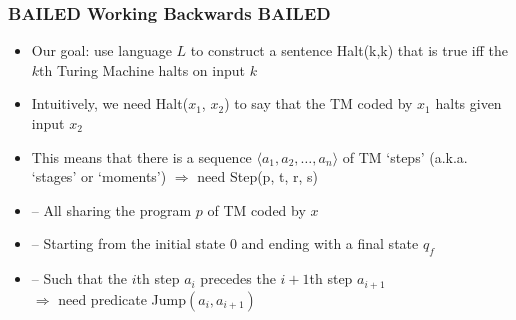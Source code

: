 \fi %



















\iffalse %

\begin{frame}
\frametitle{BAILED Working Backwards BAILED}

\begin{itemize}[<+->]

\item Our goal: use language $L$ to construct a sentence \textrm{Halt(k,k)} that is true iff the $k$th Turing Machine halts on input $k$



\item Intuitively, we need \textrm{Halt($x_1$, $x_2$)} to say that the TM coded by $x_1$ halts given input $x_2$ 

\item This means that there is a sequence $\langle a_1, a_2, \dots, a_n \rangle$ of TM `steps' (a.k.a. `stages' or `moments') $\Rightarrow$ need \textrm{Step(p, t, r, s)}
\item[] -- All sharing the program $p$ of TM coded by $x$
\item[] -- Starting from the initial state $0$ and ending with a final state $q_f$

\item[] -- Such that the $i$th step $a_i$ precedes the $i+1$th step $a_{i+1}$ \\ $\Rightarrow$ need predicate \textrm{Jump$(a_i, a_{i+1})$}


\end{itemize}
\end{frame}

